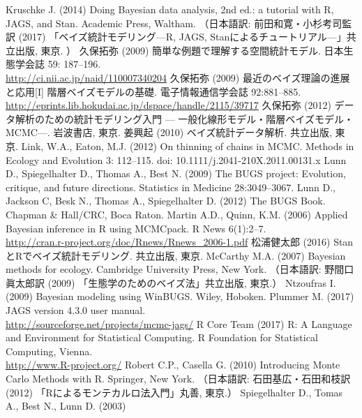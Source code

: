 \documentclass[11pt,uplatex]{jsarticle}
\begin{document}
\begin{thebibliography}{99}
 Kruschke J. (2014) Doing Bayesian data analysis, 2nd ed.:
  a tutorial with R, JAGS, and Stan. Academic Press, Waltham.
  （日本語訳: 前田和寛・小杉考司監訳 (2017) 「ベイズ統計モデリング---R, JAGS, Stanによるチュートリアル---」共立出版, 東京. ）
 久保拓弥 (2009) 簡単な例題で理解する空間統計モデル. 
  日本生態学会誌 59: 187--196. \\
  \url{http://ci.nii.ac.jp/naid/110007340204}
 久保拓弥 (2009) 最近のベイズ理論の進展と応用[I]
  階層ベイズモデルの基礎. 電子情報通信学会誌 92:881--885.\\
  \url{http://eprints.lib.hokudai.ac.jp/dspace/handle/2115/39717}
 久保拓弥 (2012) データ解析のための統計モデリング入門 ---
   一般化線形モデル・階層ベイズモデル・MCMC---. 岩波書店, 東京.
 姜興起 (2010) ベイズ統計データ解析. 共立出版, 東京.
 Link, W.A., Eaton, M.J. (2012) On thinning of chains in MCMC.
Methods in Ecology and Evolution 3: 112--115. doi: 10.1111/j.2041-210X.2011.00131.x
 Lunn D., Spiegelhalter D., Thomas A., Best N. (2009)
  {The BUGS project: Evolution, critique, and future directions}.
  {Statistics in Medicine} {28}:3049--3067.
 Lunn D., Jackson C, Besk N., Thomas A., Spiegelhalter D.
  (2012) The {BUGS} Book. Chapman \& Hall/CRC, Boca Raton.
 Martin A.D., Quinn, K.M. (2006) Applied Bayesian inference in R
using MCMCpack. R News 6(1):2--7. \\
    \url{http://cran.r-project.org/doc/Rnews/Rnews_2006-1.pdf}
 松浦健太郎 (2016) StanとRでベイズ統計モデリング. 共立出版, 東京.
 McCarthy M.A. (2007) Bayesian methods for ecology.
  Cambridge University Press, New York.
  （日本語訳: 野間口眞太郎訳 (2009) 「生態学のためのベイズ法」共立出版, 東京.）
 Ntzoufras I. (2009) Bayesian modeling using WinBUGS.
  Wiley, Hoboken.
 Plummer M. (2017) JAGS version 4.3.0 user manual.\\
  \url{http://sourceforge.net/projects/mcmc-jags/}
 R Core Team (2017)
   R: A Language and Environment for Statistical Computing.
   R Foundation for Statistical Computing, Vienna.\\
   \url{http://www.R-project.org/}
 Robert C.P., Casella G. (2010) Introducing Monte Carlo Methods with R.
  Springer, New York.
  （日本語訳: 石田基広・石田和枝訳 (2012) 「Rによるモンテカルロ法入門」丸善, 東京.）
 Spiegelhalter D., Tomas A., Best N., Lunn D. (2003)

\end{thebibliography}
\end{document}
